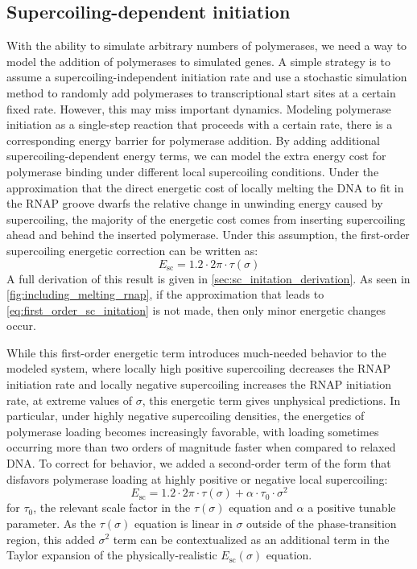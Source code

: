 \documentclass[11pt]{article}
\begin{document}
\subsection{Supercoiling-dependent initiation}
With the ability to simulate arbitrary numbers of polymerases, we need a way to model the addition of polymerases to simulated genes. A simple strategy is to assume a supercoiling-independent initiation rate and use a stochastic simulation method to randomly add polymerases to transcriptional start sites at a certain fixed rate. However, this may miss important dynamics. Modeling polymerase initiation as a single-step reaction that proceeds with a certain rate, there is a corresponding energy barrier for polymerase addition. By adding additional supercoiling-dependent energy terms, we can model the extra energy cost for polymerase binding under different local supercoiling conditions. Under the approximation that the direct energetic cost of locally melting the DNA to fit in the RNAP groove dwarfs the relative change in unwinding energy caused by supercoiling, the majority of the energetic cost comes from inserting supercoiling ahead and behind the inserted polymerase. Under this assumption, the first-order supercoiling energetic correction can be written as:
\begin{equation}
    E_\text{sc} = 1.2  \cdot 2\pi \cdot \tau(\sigma)
\label{eq:first_order_sc_initation}
\end{equation}
A full derivation of this result is given in \cref{sec:sc_initation_derivation}. As seen in \cref{fig:including_melting_rnap}, if the approximation that leads to \cref{eq:first_order_sc_initation} is not made, then only minor energetic changes occur.

While this first-order energetic term introduces much-needed behavior to the modeled system, where locally high positive supercoiling decreases the RNAP initiation rate and locally negative supercoiling increases the RNAP initiation rate, at extreme values of \(\sigma\), this energetic term gives unphysical predictions. In particular, under highly negative supercoiling densities, the energetics of polymerase loading becomes increasingly favorable, with loading sometimes occurring more than two orders of magnitude faster when compared to relaxed DNA. To correct for behavior, we added a second-order term of the form that disfavors polymerase loading at highly positive or negative local supercoiling:
\begin{equation}
    E_\text{sc} = 1.2  \cdot 2\pi \cdot \tau(\sigma) + \alpha \cdot \tau_0 \cdot \sigma^2
\label{eq:second_order_sc_initation}
\end{equation}
for \(\tau_0\), the relevant scale factor in the \(\tau(\sigma)\) equation \parencite{markoTorqueDynamicsLinking2007} and \(\alpha\) a positive tunable parameter. As the \(\tau(\sigma)\) equation is linear in \(\sigma\) outside of the phase-transition region, this added \(\sigma^2\) term can be contextualized as an additional term in the Taylor expansion of the physically-realistic \(E_\text{sc}(\sigma)\) equation.
\end{document}
